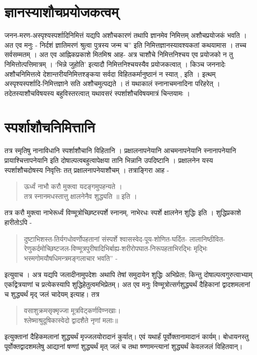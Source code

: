 \section{ज्ञानस्याशौचप्रयोजकत्वम्}  

जनन-मरण-अस्पृश्यस्पर्शादिनिमित्तं यद्यपि अशौचकारणं तथापि ज्ञानमेव निमित्तम् अशौचप्रयोजकं भवति । अत एव मनुः - निर्दशं ज्ञातिमरणं श्रुत्वा पुत्रस्य जन्म च” इति निमित्तज्ञानस्यावश्यकतां कथयामास । तच्च सर्वसम्मतम् । अत एव आह्निकप्रकाशे मितमिश्र आह- अत्र चाशौचे निमित्तनिश्चय एव प्रयोजको न तु निमित्तोत्पत्तिमात्रम् । ‘भिन्ने जुहोति’ इत्यादौ निमित्तनिश्चयस्यैव प्रयोजकत्वात् । किञ्च जननादेः अशौचनिमित्तत्वे देशान्तरीयनिमित्तश्ङ्कया सर्वदा विहितकर्मानुष्ठानं न स्यात् , इति । इत्थम् अस्पृश्यस्पर्शादि-निमित्तज्ञाने सति अशौचमुत्पद्यते । तं यथाकालं स्नानाचमनादिना परिहरेत् । तदेतस्याशौचविषयस्य बहुविस्तरत्वात् यथावसरं स्पर्शाशौचविषयमात्रं चिन्तयामः ।

\section*{स्पर्शाशौचनिमित्तानि}

तत्र स्मृतिषु नानाविधानि स्पर्शाशौचानि विहितानि । प्रक्षालनापनेयानि आचमनापनेयानि स्नानापनेयानि प्रायाश्चित्तापनेयानि इति दोषाल्पत्वबहुत्वापेक्षया तानि भिन्नानि उपदिष्टानि । प्रक्षालनेन यस्य स्पर्शाशौचदोषस्य निवृत्तिः तत् प्रक्षालनापनेयाशौचम् । तत्राङ्गिरा आह -
\begin{verse}
ऊर्ध्वं नाभौ करौ मुक्त्वा यदङ्गमुपहन्यते ।\\
तत्र स्नानमधस्तात्तु क्षालनेनैव शुद्ध्यति ॥ इति । 
\end{verse}
तत्र करौ मुक्त्वा नाभेरूर्ध्वं विण्मूत्रोच्छिष्टस्पर्शे स्नानम्, नाभेरधः स्पर्शे क्षालनेन शुद्धिः इति । शुद्धिप्रकाशे हारीतोऽपि - 
\begin{quote}
दुष्टाभिशस्त-तिर्यगधोवर्णोपहतानां संस्पर्शे श्वासस्वेद-पूय-शोणित-घर्दित- लालानिष्ठीवित-रेणुकर्दमोच्छिष्टजल-विण्मूत्रपुरीषादिभिर्बाह्य-शरीरोपघात-निरूपहताभिरद्भिः मृद्भिः भस्मगोमयौषधिमन्त्रमङ्गलाचार भवति” -
\end{quote}
इत्युवाच । अत्र यद्यपि जलादीनामुपदेशः अथापि तेषां समुदायेन शुद्धिः अभिप्रेता; किन्तु दोषाल्पत्वगुरुत्वाभ्याम् एकद्वित्रयाणां च प्रत्येकस्यापि शुद्धिहेतुत्वमभिप्रेतम्। अत एव मनुः विण्मूत्रोत्सर्गशुद्ध्यर्थं दैहिकानां द्वादशमलानां च शुद्ध्यर्थं मृद् जलं चादेयम् इत्याह। तत्र 
\begin{verse}
वसाशुक्रमसृक्मृज्जा मूत्रविट्कर्णविण्नखाः। \\
श्लेष्माश्रुदूषिकास्वेदो द्वादशैते नृणां मलाः॥
\end{verse}
इत्युक्तानां दैहिकमलानां शुद्ध्यर्थं मृज्जलयोरादानं कुर्यात्। एवं यथार्हं पूर्वोक्तानामादानं कार्यम्। बोधायनस्तु पूर्वोक्तद्वादशमलेषु आद्यानां षण्णां शुद्ध्यर्थं मृत् जलं च तथा ष्ण्णामन्त्यानां शुद्ध्यर्थं केवलजलं विहितवान्।

